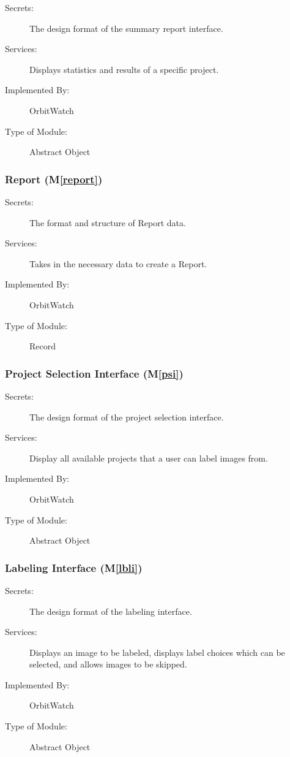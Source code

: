 \documentclass[12pt, titlepage]{article}
\newcommand{\mref}[1]{M\ref{#1}}
\begin{document}
\begin{description}
\item[Secrets:]The design format of the summary report interface.
\item[Services:] Displays statistics and results of a specific project.
\item[Implemented By:] OrbitWatch
\item[Type of Module:] Abstract Object
\end{description}

\subsubsection{Report (\mref{report})}

\begin{description}
\item[Secrets:]The format and structure of Report data.
\item[Services:] Takes in the necessary data to create a Report.
\item[Implemented By:] OrbitWatch
\item[Type of Module:] Record
\end{description}

\subsubsection{Project Selection Interface (\mref{psi})}

\begin{description}
\item[Secrets:]The design format of the project selection interface.
\item[Services:] Display all available projects that a user can label images from.
\item[Implemented By:] OrbitWatch
\item[Type of Module:] Abstract Object
\end{description}

\subsubsection{Labeling Interface (\mref{lbli})}

\begin{description}
\item[Secrets:] The design format of the labeling interface.
\item[Services:] Displays an image to be labeled, displays label choices which can be selected, and allows images to be skipped.
\item[Implemented By:] OrbitWatch
\item[Type of Module:] Abstract Object
\end{description}
\end{document}

